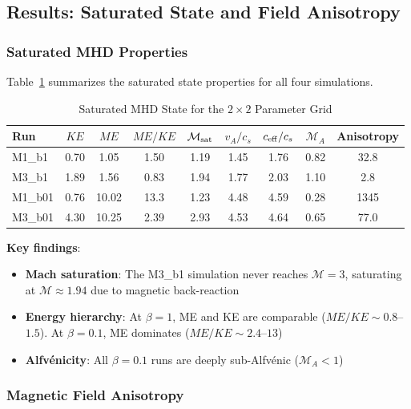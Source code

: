 \documentclass[11pt,a4paper]{article}
\begin{document}
\subsection{Results: Saturated State and Field Anisotropy}

\subsubsection{Saturated MHD Properties}

Table~\ref{tab:mhd_saturated} summarizes the saturated state properties for all four simulations.

\begin{table}[H]
\centering
\caption{Saturated MHD State for the $2\times2$ Parameter Grid}
\label{tab:mhd_saturated}
\begin{tabular}{lcccccccc}
\toprule
Run & $KE$ & $ME$ & $ME/KE$ & $\mathcal{M}_{\rm sat}$ & $v_A/c_s$ & $c_{\rm eff}/c_s$ & $\mathcal{M}_A$ & Anisotropy \\
\midrule
M1\_b1  & 0.70 & 1.05 & 1.50 & 1.19 & 1.45 & 1.76 & 0.82 & 32.8 \\
M3\_b1  & 1.89 & 1.56 & 0.83 & 1.94 & 1.77 & 2.03 & 1.10 & 2.8 \\
M1\_b01 & 0.76 & 10.02 & 13.3 & 1.23 & 4.48 & 4.59 & 0.28 & 1345 \\
M3\_b01 & 4.30 & 10.25 & 2.39 & 2.93 & 4.53 & 4.64 & 0.65 & 77.0 \\
\bottomrule
\end{tabular}
\end{table}

\noindent\textbf{Key findings}:
\begin{itemize}
    \item \textbf{Mach saturation}: The M3\_b1 simulation never reaches $\mathcal{M} = 3$, saturating at $\mathcal{M} \approx 1.94$ due to magnetic back-reaction
    \item \textbf{Energy hierarchy}: At $\beta = 1$, ME and KE are comparable ($ME/KE \sim 0.8$--$1.5$). At $\beta = 0.1$, ME dominates ($ME/KE \sim 2.4$--$13$)
    \item \textbf{Alfv\'enicity}: All $\beta = 0.1$ runs are deeply sub-Alfv\'enic ($\mathcal{M}_A < 1$)
\end{itemize}

\subsubsection{Magnetic Field Anisotropy}
\end{document}
